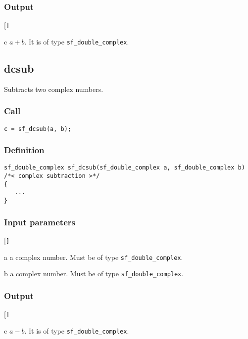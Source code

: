 \subsubsection*{Output}
\begin{desclist}{\tt }{\quad}[\tt ]
   \setlength\itemsep{0pt}
   \item[c] $a+b$. It is of type \texttt{sf\_double\_complex}.
\end{desclist}




\subsection{{dcsub}}
Subtracts two complex numbers.

\subsubsection*{Call}
\begin{verbatim}c = sf_dcsub(a, b);\end{verbatim}

\subsubsection*{Definition}
\begin{verbatim}
sf_double_complex sf_dcsub(sf_double_complex a, sf_double_complex b)
/*< complex subtraction >*/
{
   ...
}
\end{verbatim}

\subsubsection*{Input parameters}
\begin{desclist}{\tt }{\quad}[\tt ]
   \setlength\itemsep{0pt}
   \item[a] a complex number. Must be of type \texttt{sf\_double\_complex}. 
   \item[b] a complex number. Must be of type \texttt{sf\_double\_complex}.  
\end{desclist}

\subsubsection*{Output}
\begin{desclist}{\tt }{\quad}[\tt ]
   \setlength\itemsep{0pt}
   \item[c] $a-b$. It is of type \texttt{sf\_double\_complex}.
\end{desclist}




